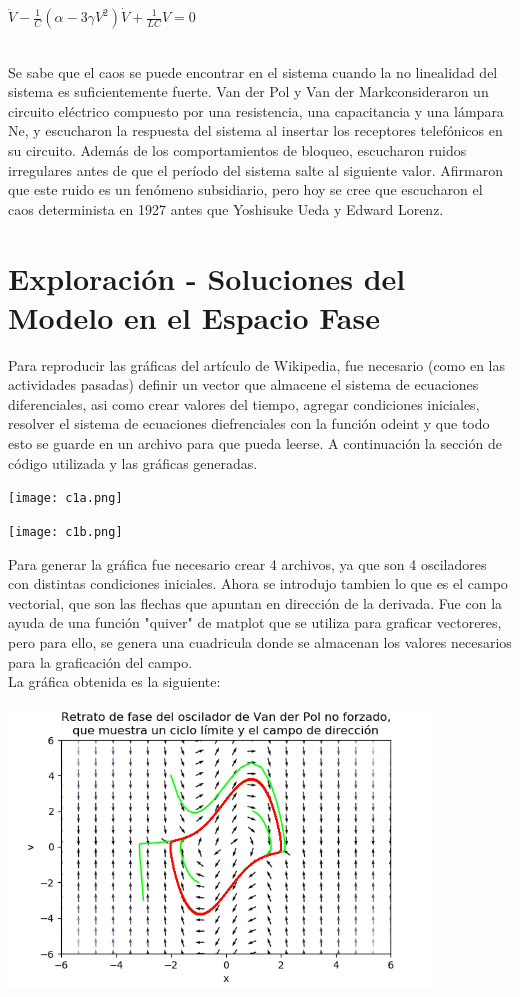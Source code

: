 \documentclass[12pt]{article}
\begin{document}
\centerline{$\displaystyle \ddot V - \frac{1}{C}(\alpha-3\gamma V^2)\dot V+\frac{1}{LC}V=0$}
$ $\\
Se sabe que el caos se puede encontrar en el sistema cuando la no linealidad del sistema es suficientemente fuerte. Van der Pol y Van der Markconsideraron un circuito eléctrico compuesto por una resistencia, una capacitancia y una lámpara Ne, y escucharon la respuesta del sistema al insertar los receptores telefónicos en su circuito. Además de los comportamientos de bloqueo, escucharon ruidos irregulares antes de que el período del sistema salte al siguiente valor. Afirmaron que este ruido es un fenómeno subsidiario, pero hoy se cree que escucharon el caos determinista en 1927 antes que Yoshisuke Ueda y Edward Lorenz.

\section*{Exploración - Soluciones del Modelo en el Espacio Fase}
Para reproducir las gráficas del artículo de Wikipedia, fue necesario (como en las actividades pasadas) definir un vector que almacene el sistema de ecuaciones diferenciales, asi como crear valores del tiempo, agregar condiciones iniciales, resolver el sistema de ecuaciones diefrenciales con la función odeint y que todo esto se guarde en un archivo para que pueda leerse. A continuación la sección de código utilizada y las gráficas generadas.
\begin{center}
    \texttt{[image: c1a.png]}\\
\end{center}
\begin{center}
    \texttt{[image: c1b.png]}\\
\end{center}
Para generar la gráfica fue necesario crear 4 archivos, ya que son 4 osciladores con distintas condiciones iniciales. Ahora se introdujo tambien lo que es el campo vectorial, que son las flechas que apuntan en dirección de la derivada. Fue con la ayuda de una función "quiver" de matplot que se utiliza para graficar vectoreres, pero para ello, se genera una cuadricula donde se almacenan los valores necesarios para la graficación del campo.\\

La gráfica obtenida es la siguiente:
\begin{center}
    \includegraphics[height=7.5cm]{Producto1.png}\\
\end{center}
\end{document}

